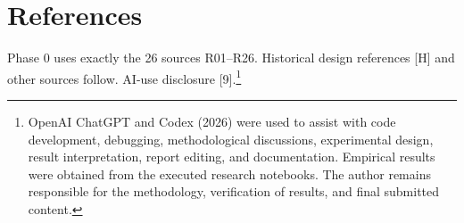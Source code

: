 \documentclass[
  12pt,
  a4paper,
]{article}
\renewcommand{\arraystretch}{1.16}
\newcommand{\parttag}{Main report}
\begin{document}
\clearpage

\fontsize{11.8pt}{14.32pt}\selectfont
\setlength{\parskip}{5pt plus .8pt minus .3pt}
\renewcommand{\arraystretch}{1.16}
\renewcommand{\parttag}{References}

\section{References}\label{references}

Phase 0 uses exactly the 26 sources R01--R26. Historical design
references {[}H{]} and other sources follow. AI-use disclosure
{[}9{]}.\footnote{\fontsize{8.5bp}{10.2bp}\selectfont OpenAI ChatGPT and Codex (2026) were used to assist with code development, debugging, methodological discussions, experimental design, result interpretation, report editing, and documentation. Empirical results were obtained from the executed research notebooks. The author remains responsible for the methodology, verification of results, and final submitted content.}
\end{document}

